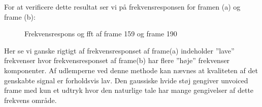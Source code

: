 For at verificere dette resultat ser vi på frekvensresponsen for framen (a) og frame (b):
 \begin{figure}[!h]
	\centering
	\caption{ Frekvensrespons og fft af frame 159 og frame 190 }
	\label{fig:part4_vocaltrack}
\end{figure}

Her se vi ganske rigtigt af frekvensresponset af frame(a) indeholder ''lave'' frekvenser hvor frekvensresponset af frame(b) har flere ''høje'' frekvenser komponenter.
Af udlemperne ved denne methode kan nævnes at kvaliteten af det genskabte signal er forholdsvis lav. Den gaussiske hvide støj gengiver  unvoiced frame med kun et udtryk hvor den naturlige tale har mange gengivelser af dette frekvens område.   